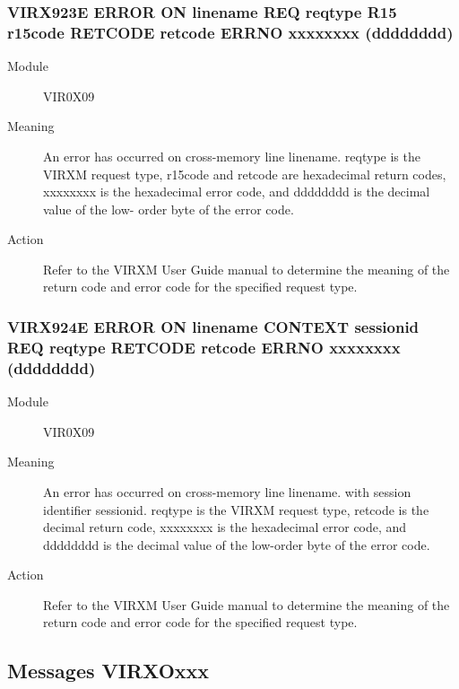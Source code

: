 \documentclass[letterpaper,10pt,english]{sphinxmanual}
\begin{document}
\subsubsection{VIRX923E ERROR ON linename REQ reqtype R15 r15code RETCODE retcode ERRNO xxxxxxxx (dddddddd)}
\label{\detokenize{messages:virx923e-error-on-linename-req-reqtype-r15-r15code-retcode-retcode-errno-xxxxxxxx-dddddddd}}\begin{description}
\item[{Module}] \leavevmode
VIR0X09

\item[{Meaning}] \leavevmode
An error has occurred on cross-memory line linename. reqtype is the VIRXM request type, r15code and retcode are hexadecimal return codes, xxxxxxxx is the hexadecimal error code, and dddddddd is the decimal value of the low- order byte of the error code.

\item[{Action}] \leavevmode
Refer to the VIRXM User Guide manual to determine the meaning of the return code and error code for the specified request type.

\end{description}


\subsubsection{VIRX924E ERROR ON linename CONTEXT sessionid REQ reqtype RETCODE retcode ERRNO xxxxxxxx (dddddddd)}
\label{\detokenize{messages:virx924e-error-on-linename-context-sessionid-req-reqtype-retcode-retcode-errno-xxxxxxxx-dddddddd}}\begin{description}
\item[{Module}] \leavevmode
VIR0X09

\item[{Meaning}] \leavevmode
An error has occurred on cross-memory line linename. with session identifier sessionid. reqtype is the VIRXM request type, retcode is the decimal return code, xxxxxxxx is the hexadecimal error code, and dddddddd is the decimal value of the low-order byte of the error code.

\item[{Action}] \leavevmode
Refer to the VIRXM User Guide manual to determine the meaning of the return code and error code for the specified request type.

\end{description}


\subsection{Messages VIRXOxxx}
\label{\detokenize{messages:messages-virxoxxx}}
\end{document}
